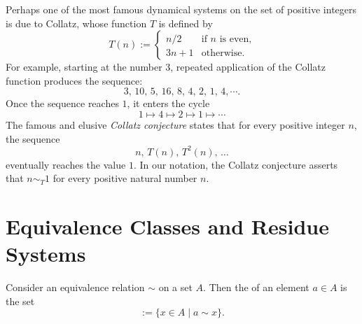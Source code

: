 Perhaps one of the most famous dynamical systems on the set of positive integers is due to Collatz, whose function $T$ is defined by
\begin{equation*}
  T(n) :=
  \begin{cases}
    n/2 & \text{if $n$ is even,} \\
    3n+1 & \text{otherwise.}
  \end{cases}
\end{equation*}
For example, starting at the number $3$, repeated application of the Collatz function produces the sequence:
\begin{equation*}
  3,\,10,\,5,\,16,\,8,\,4,\,2,\,1,\,4,\cdots.
\end{equation*}
Once the sequence reaches $1$, it enters the cycle
\begin{equation*}
  1\mapsto 4\mapsto 2\mapsto 1\mapsto \cdots
\end{equation*}
The famous and elusive \emph{Collatz conjecture} states that for every positive integer $n$, the sequence
\begin{equation*}
  n,\,T(n),\,T^2(n),\,\ldots
\end{equation*}
eventually reaches the value $1$. In our notation, the Collatz conjecture asserts that $n\sim_T 1$ for every positive natural number $n$.

\section{Equivalence Classes and Residue Systems}

\begin{definition}
  Consider an equivalence relation $\sim$ on a set $A$. Then the  of an element $a\in A$ is the set
  \begin{equation*}
    [a] := \{x\in A \mid a \sim x\}.
  \end{equation*}
\end{definition}

